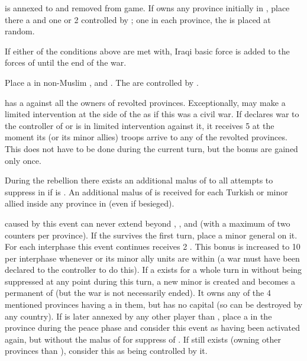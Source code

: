 
\phevnt
\aparag \paysIrak is annexed to \paysperse and removed from game.
\aparag If \TUR owns any province initially in \paysIrak, place there a
\REVOLT \faceplus and one or 2 \REVOLT \facemoins controlled by \paysperse;
one \REVOLT in each province, the \REVOLT \faceplus is placed at random.

\phadm
\aparag If either of the conditions above are met with, Iraqi basic force is
added to the forces of \paysperse until the end of the war.





\phevnt
\aparag Place a \REVOLT \facemoins in non-Muslim \provinceGranada,
\provinceCordoba and . The \REVOLT are controlled by \TUR.

\phdipl
\aparag \TUR has a \CB against all the owners of revolted provinces.
\bparag Exceptionally, \TUR may make a limited intervention at the side of the
\REVOLT as if this was a civil war.
\aparag If \TUR declares war to the controller of \provinceGranada or is in
limited intervention against it, it receives 5 \VP at the moment its (or its
minor allies) troops arrive to any of the revolted provinces. This does not
have to be done during the current turn, but the bonus \VP are gained only
once.

\phmil
\aparag During the rebellion there exists an additional malus of  to
all attempts to suppress \REVOLT in \provinceGranada if \SPA is \CATHCR. An
additional malus of  is received for each Turkish or minor allied
\LD inside any province in \REVOLT (even if besieged).

\phinter
\aparag \REVOLT caused by this event can never extend beyond \provinceGranada,
\provinceCordoba, \provinceMurcia and  (with a maximum of
two \REVOLT counters per province).
\aparag If the \REVOLT survives the first turn, place a minor general on it.
\aparag For each interphase this event continues \TUR receives 2 \VP.  This
bonus is increased to 10 \VP per interphase whenever \TUR or its minor ally
units are within \provinceGranada (a war must have been declared to the
controller to do this).
\aparag If a \REVOLT \faceplus exists for a whole turn in \provinceGranada
without being suppressed at any point during this turn, a new minor
\paysGrenade is created and becomes a permanent \VASSAL of \TUR (but the war
is not necessarily ended). It owns any of the 4 mentioned provinces having a
\REVOLT in them, but has no capital (so can be destroyed by any country).
\aparag If \provinceGranada is later annexed by any other player than \TUR,
place a \REVOLT \facemoins in the province during the peace phase and consider
this event as having been activated again, but without the malus of 
for suppress of \REVOLT . If \paysGrenade still exists (owning other provinces
than \provinceGranada), consider this \REVOLT as being controlled by it.

